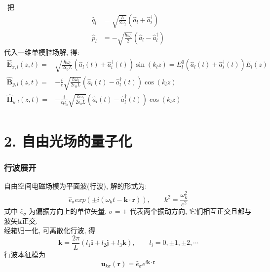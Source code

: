 \begin{frame}
    \frametitle{}
    \例 [1.求一维单模腔场电磁场分量的算符形式] {}
    \解 ~把 
      \[ \begin{aligned}
        \hat{q}_l &= \sqrt{\frac{\hbar}{ 2\omega_l}} (\hat{a}_l+ \hat{a}_l ^\dagger) \\ 
        \hat{p}_l &= -\sqrt{\frac{\hbar\omega_l}{2 }} (\hat{a}_l- \hat{a}_l ^\dagger)  
     \end{aligned} \] 
    代入一维单模腔场解, 得:
    \[ \begin{aligned}
      \hat{\mathbf{E}}_{x,l}( z,t) =& \sqrt{\frac{\hbar\omega_l}{ 2\epsilon_0 L }} (\hat{a}_l(t)+ \hat{a}_l ^\dagger(t)) \sin(k_l z) = E^0 _l (\hat{a}_l(t)+ \hat{a}_l ^\dagger(t)) E_l(z)\\
      \hat{\mathbf{B}}_{y,l}( z,t) =& -\frac{i}{c} \sqrt{\frac{\hbar\omega_l}{ 2\epsilon_0 L }} (\hat{a}_l(t)- \hat{a}_l ^\dagger(t)) \cos(k_l z) \\
      \hat{\mathbf{H}}_{y,l}( z,t) =& -\frac{i}{c\mu_0} \sqrt{ \frac{\hbar\omega_l}{2\epsilon_0 L }} (\hat{a}_l(t)- \hat{a}_l ^\dagger(t)) \cos(k_l z) \\
      \end{aligned} 
      \] 
\end{frame}

\section{2. 自由光场的量子化}

\begin{frame}
      \frametitle{行波展开}
      自由空间电磁场模为平面波(行波), 解的形式为:
      \[  \hat{e}_\sigma exp (\pm i (\omega_k t - \mathbf{k}\cdot \mathbf{r})), \qquad k^2 =\frac{\omega_k ^2}{c^2} \]
      式中 $\hat{e}_\sigma $ 为偏振方向上的单位矢量, $\sigma=\pm$ 代表两个振动方向, 它们相互正交且都与波矢$\mathbf{k}$正交. \\ \vspace*{1em} 
      经箱归一化, 可离散化行波, 得 
      \[ \mathbf{k} = \frac{2\pi}{L} (l_1 \mathbf{i} + l_2 \mathbf{j}+ l_3 \mathbf{k}), \qquad l_i= 0, \pm 1, \pm 2, \cdots \]
      行波本征模为
      \[ \mathbf{u}_{k\sigma} (\mathbf{r}) = \hat{e}_\sigma e^{i \mathbf{k}\cdot \mathbf{r}}\]
\end{frame} 

